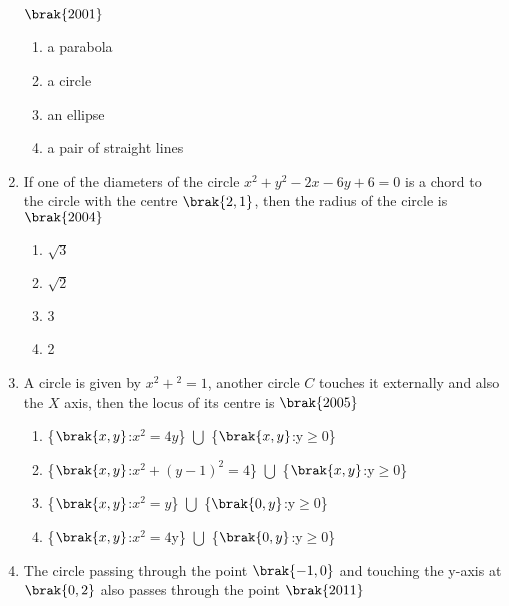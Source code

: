 \begin{enumerate}[label=\thesubsection.\arabic*.,ref=\thesubsection.\theenumi]
        \hfill$\brak{2001}$
        \begin{multicols}{2}
\begin{enumerate}
        \item a parabola
        \item a circle
        \item an ellipse
        \item a pair of straight lines
        \end{enumerate}
        \end{multicols}
     \item If one of the diameters of the circle $x^2+y^2-2x-6y+6=0$ is a chord to the circle with the centre $\brak{2, 1}$, then the radius of the circle is 
         \hfill$\brak{2004}$
         \begin{multicols}{2}
     \begin{multicols}{4}
\begin{enumerate}
         \item $\sqrt3$
         \item $\sqrt2$
         \item 3
         \item 2
     \end{enumerate}
\end{multicols}
     \end{multicols}
     \item A circle is given by $x^2+$$^2=1$,  another circle $C$ touches it externally and also the $X$ axis,  then the locus of its centre is
         \hfill$\brak{2005}$
     \begin{multicols}{2}
\begin{enumerate}
         \item \{$\brak{x, y}$:$x^2=4y$\} $\bigcup$ \{$\brak{x, y}$:y$\ge$0\}
         \item \{$\brak{x, y}$:$x^2+(y-1)^2=4$\} $\bigcup$ \{$\brak{x, y}$:y$\ge$0\}
         \item \{$\brak{x, y}$:$x^2=y$\} $\bigcup$ \{$\brak{0, y}$:y$\ge$0\}
         \item \{$\brak{x, y}$:$x^2=4$y\} $\bigcup$ \{$\brak{0, y}$:y$\ge$0\}
         \end{enumerate}
         \end{multicols}
             \item The circle passing through the point $\brak{-1, 0}$ and touching the y-axis at $\brak{0, 2}$ also passes through the point
                 \hfill$\brak{2011}$
             \begin{multicols}{4}

\end{multicols}
\end{enumerate}
